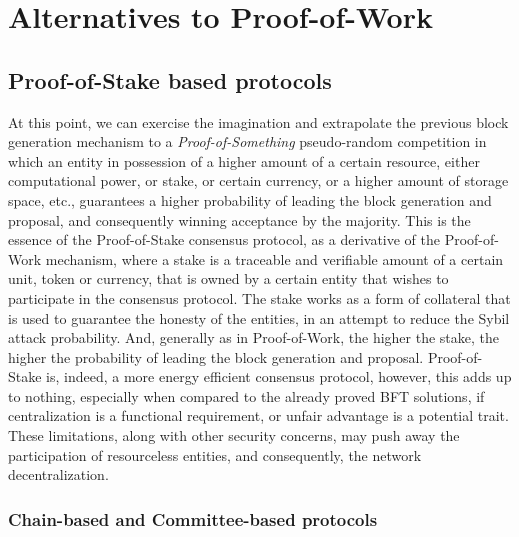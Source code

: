 \documentclass[journal]{IEEEtran}
\begin{document}
\section{Alternatives to Proof-of-Work}

\subsection{Proof-of-Stake based protocols}

At this point, we can exercise the imagination and extrapolate the
previous block generation mechanism to a \emph{Proof-of-Something} 
pseudo-random competition in which an entity in possession of a higher
amount of a certain resource, either computational power, or stake, 
or certain currency, or a higher amount of storage space, etc., guarantees
a higher probability of leading the block generation and proposal, and
consequently winning acceptance by the majority. This is the essence of
the Proof-of-Stake consensus protocol, as a derivative of the Proof-of-Work
mechanism, where a stake is a traceable and verifiable amount of a certain
unit, token or currency, that is owned by a certain entity that wishes to
participate in the consensus protocol. The stake works as a form of collateral
that is used to guarantee the honesty of the entities, in an attempt to
reduce the Sybil attack probability. And, generally as in Proof-of-Work, 
the higher the stake, the higher the probability of leading the block generation 
and proposal. Proof-of-Stake is, indeed, a more energy efficient consensus protocol,
however, this adds up to nothing, especially when compared to the already proved
BFT solutions, if centralization is a functional requirement, 
or unfair advantage is a potential trait. 
These limitations, along with other security concerns, may push away the 
participation of resourceless entities, and consequently, the network
decentralization.

\subsubsection{Chain-based and Committee-based protocols}
\end{document}
